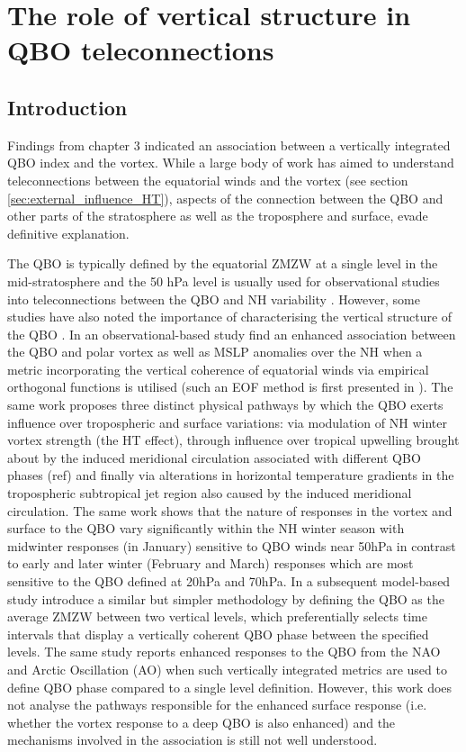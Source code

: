 \chapter{The role of vertical structure in QBO teleconnections}
\label{cha:deepQBO}

\section{Introduction}
\label{sec:deepQBO-introduction}

Findings from chapter 3 indicated an association between a vertically integrated QBO index and the vortex. While a large body of work has aimed to understand teleconnections between the equatorial winds and the vortex (see section \ref{sec:external_influence_HT}), aspects of the connection between the QBO and other parts of the stratosphere as well as the troposphere and surface, evade definitive explanation.

The QBO is typically defined by the equatorial ZMZW at a single level in the mid-stratosphere and the 50 hPa level is usually used for observational studies into teleconnections between the QBO and NH variability \citep{baldwinQuasiBiennial2001}. However, some studies have also noted the importance of characterising the vertical structure of the QBO \citep{Fraedrih1993, Wallace1993,  Baldwin98,  Dunkerton2017, graySurface2018, andrewsObserved2019}. In an observational-based study \cite{graySurface2018} find an enhanced association between the QBO and polar vortex as well as MSLP anomalies over the NH when a metric incorporating the vertical coherence of equatorial winds via empirical orthogonal functions is utilised (such an EOF method is first presented in \citep{verena2016a}). The same work proposes three distinct physical pathways by which the QBO exerts influence over tropospheric and surface variations: via modulation of NH winter vortex strength (the HT effect), through influence over tropical upwelling brought about by the induced meridional circulation associated with different QBO phases (ref) and finally via alterations in horizontal temperature gradients in the tropospheric subtropical jet region also caused by the induced meridional circulation. The same work shows that the nature of responses in the vortex and surface to the QBO vary significantly within the NH winter season with midwinter responses (in January) sensitive to QBO winds near 50hPa in contrast to early and later winter (February and March) responses which are most sensitive to the QBO defined at 20hPa and 70hPa. In a subsequent model-based study \cite{andrewsObserved2019} introduce a similar but simpler methodology by defining the QBO as the average ZMZW between two vertical levels, which preferentially selects time intervals that display a vertically coherent QBO phase between the specified levels. The same study reports enhanced responses to the QBO from the NAO and Arctic Oscillation (AO) when such vertically integrated metrics are used to define QBO phase compared to a single level definition. However, this work does not analyse the pathways responsible for the enhanced surface response (i.e. whether the vortex response to a deep QBO is also enhanced) and the mechanisms involved in the association is still not well understood. 

